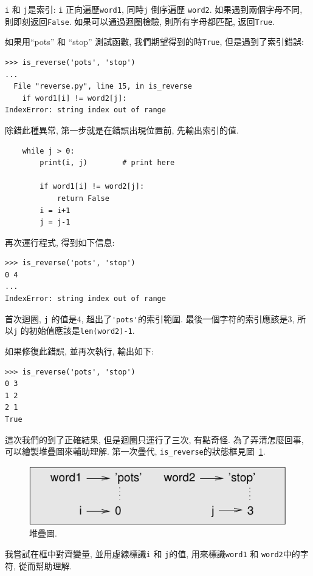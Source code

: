 \documentclass[10pt]{book}
\begin{document}
{\tt i} 和 {\tt j}是索引: {\tt i} 正向遍歷{\tt word1}, 同時{\tt j} 倒序遍歷
{\tt word2}. 如果遇到兩個字母不同, 則即刻返回{\tt False}. 
如果可以通過迴圈檢驗, 則所有字母都匹配, 返回{\tt True}. 

如果用``pots'' 和 ``stop'' 測試函數, 我們期望得到的時{\tt True}, 
但是遇到了索引錯誤:

\begin{verbatim}
>>> is_reverse('pots', 'stop')
...
  File "reverse.py", line 15, in is_reverse
    if word1[i] != word2[j]:
IndexError: string index out of range
\end{verbatim}
%
除錯此種異常, 第一步就是在錯誤出現位置前, 先輸出索引的值. 

\begin{verbatim}
    while j > 0:
        print(i, j)        # print here
        
        if word1[i] != word2[j]:
            return False
        i = i+1
        j = j-1
\end{verbatim}
%
再次運行程式, 得到如下信息:

\begin{verbatim}
>>> is_reverse('pots', 'stop')
0 4
...
IndexError: string index out of range
\end{verbatim}
%
首次迴圈,  {\tt j} 的值是4,
超出了\verb"'pots'"的索引範圍. 
最後一個字符的索引應該是3,
所以{\tt j} 的初始值應該是{\tt len(word2)-1}.

如果修復此錯誤, 並再次執行, 輸出如下:

\begin{verbatim}
>>> is_reverse('pots', 'stop')
0 3
1 2
2 1
True
\end{verbatim}
%
這次我們的到了正確結果, 但是迴圈只運行了三次, 有點奇怪. 
為了弄清怎麼回事, 可以繪製堆疊圖來輔助理解. 
第一次疊代, \verb"is_reverse"的狀態框見圖~\ref{fig.state4}.  
 

\begin{figure}
\centerline
{\includegraphics[scale=0.8]{figs/state4.pdf}}
\caption{堆疊圖.}
\label{fig.state4}
\end{figure}

我嘗試在框中對齊變量, 並用虛線標識{\tt i} 和
{\tt j}的值, 用來標識{\tt word1} 和 {\tt word2}中的字符, 
從而幫助理解. 
\end{document}
